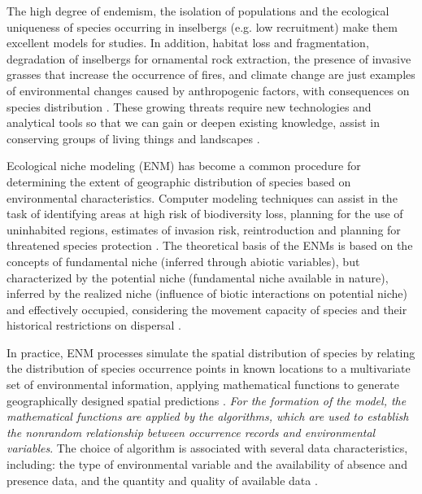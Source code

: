 The high degree of endemism, the isolation of populations and the ecological uniqueness of species occurring in inselbergs (e.g. low recruitment) make them excellent models for studies. In addition, habitat loss and fragmentation, degradation of inselbergs for ornamental rock extraction, the presence of invasive grasses that increase the occurrence of fires, and climate change are just examples of environmental changes caused by anthropogenic factors, with consequences on species distribution \citep{szarzynski2000XericIslandsEnvironmental, safford2000SoutheastBrazil, porembski2007TropicalInselbergsHabitat}. These growing threats require new technologies and analytical tools so that we can gain or deepen existing knowledge, assist in conserving groups of living things and landscapes \citep{peterson2002FutureProjectionsMexican, ortega-huerta2004ModellingSpatialPatterns}.
 
Ecological niche modeling (ENM) has become a common procedure for determining the extent of geographic distribution of species based on environmental characteristics. Computer modeling techniques can assist in the task of identifying areas at high risk of biodiversity loss, planning for the use of uninhabited regions, estimates of invasion risk, reintroduction and planning for threatened species protection \citep{guisan2005PredictingSpeciesDistribution, correa2011ComputationalTechniquesBiologic}. The theoretical basis of the ENMs is based on the concepts of fundamental niche (inferred through abiotic variables), but characterized by the potential niche (fundamental niche available in nature), inferred by the realized niche (influence of biotic interactions on potential niche) and effectively occupied, considering the movement capacity of species and their historical restrictions on dispersal \citep{colwell2009HutchinsonDualityOnce, soberon2009NichesDistributionalAreas}.

In practice, ENM processes simulate the spatial distribution of species by relating the distribution of species occurrence points in known locations to a multivariate set of environmental information, applying mathematical functions to generate geographically designed spatial predictions \citep{guisan2000PredictiveHabitatDistribution, guisan2005PredictingSpeciesDistribution}. \textit{For the formation of the model, the mathematical functions are applied by the algorithms, which are used to establish the nonrandom relationship between occurrence records and environmental variables}. The choice of algorithm is associated with several data characteristics, including: the type of environmental variable and the availability of absence and presence data, and the quantity and quality of available data  \citep{phillips2006MaximumEntropyModeling, peterson2011EcologicalNichesGeographic}. 

